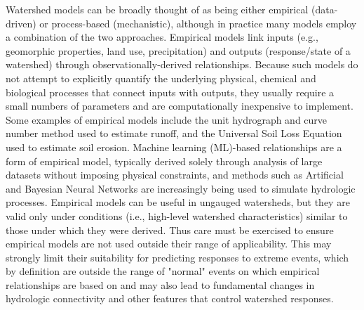 \documentclass[preprint,review, 12pt]{elsarticle}
\begin{document}

Watershed models can be broadly thought of as being either empirical (data-driven) or  process-based (mechanistic), although in practice many models employ a combination of the two approaches. Empirical models link inputs (e.g., geomorphic properties, land use, precipitation) and outputs (response/state of a watershed) through observationally-derived relationships. Because such models do not attempt to explicitly quantify the underlying physical, chemical and biological processes that connect inputs with outputs, they usually require a small numbers of parameters and are computationally inexpensive to implement. Some examples of empirical models include the unit hydrograph and curve number method \citep{USDA1986} used to estimate runoff, and the Universal Soil Loss Equation \citep{Hudson1993} used to estimate soil erosion. Machine learning (ML)-based relationships are a form of empirical model, typically derived solely through analysis of large datasets without imposing physical constraints, and methods such as Artificial and Bayesian Neural Networks \citep{Committee2000, Dawson2001, Dawson1998, Dwivedi2013} are increasingly being used to simulate hydrologic processes. Empirical models can be useful in ungauged watersheds, but they are valid only under conditions (i.e., high-level watershed characteristics) similar to those under which they were derived. Thus care must be exercised to ensure empirical models are not used outside their range of applicability. This may strongly limit their suitability for predicting responses to extreme events, which by definition are outside the range of "normal" events on which empirical relationships are based on and may also lead to fundamental changes in hydrologic connectivity and other features that control watershed responses.
\end{document}
